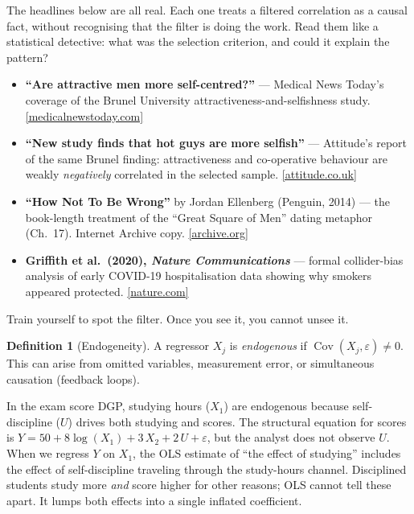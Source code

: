 \documentclass[11pt,a4paper]{article}
\theoremstyle{definition}
\newtheorem{definition}{Definition}[section]
\theoremstyle{plain}
\theoremstyle{remark}
\newcommand{\Cov}{\operatorname{Cov}}
\begin{document}
\begin{keyinsight}[title={Real Articles Committing Collider Bias}]
The headlines below are all real. Each one treats a filtered correlation as a causal fact, without recognising that the filter is doing the work. Read them like a statistical detective: what was the selection criterion, and could it explain the pattern?

\begin{itemize}[nosep]
  \item \textbf{``Are attractive men more self-centred?''} --- Medical News Today's coverage of the Brunel University attractiveness-and-selfishness study. \href{https://www.medicalnewstoday.com/articles/288998}{[medicalnewstoday.com]}
  \item \textbf{``New study finds that hot guys are more selfish''} --- Attitude's report of the same Brunel finding: attractiveness and co-operative behaviour are weakly \emph{negatively} correlated in the selected sample. \href{https://www.attitude.co.uk/news/world/new-study-finds-that-hot-guys-are-more-selfish-283534/}{[attitude.co.uk]}
  \item \textbf{``How Not To Be Wrong''} by Jordan Ellenberg (Penguin, 2014) --- the book-length treatment of the ``Great Square of Men'' dating metaphor (Ch.\ 17). Internet Archive copy. \href{https://archive.org/details/hownottobewrongp0000elle_e9m3}{[archive.org]}
  \item \textbf{Griffith et al.\ (2020), \emph{Nature Communications}} --- formal collider-bias analysis of early COVID-19 hospitalisation data showing why smokers appeared protected. \href{https://www.nature.com/articles/s41467-020-19478-2}{[nature.com]}
\end{itemize}

Train yourself to spot the filter. Once you see it, you cannot unsee it.
\end{keyinsight}

\begin{definition}[Endogeneity]
A regressor $X_j$ is \emph{endogenous} if $\Cov(X_j, \varepsilon) \neq 0$.
This can arise from omitted variables, measurement error, or simultaneous causation (feedback loops).
\end{definition}

In the exam score DGP, studying hours ($X_1$) are endogenous because self-discipline ($U$) drives both studying and scores. The structural equation for scores is $Y = 50 + 8\log(X_1) + 3\,X_2 + 2\,U + \varepsilon$, but the analyst does not observe $U$. When we regress $Y$ on $X_1$, the OLS estimate of ``the effect of studying'' includes the effect of self-discipline traveling through the study-hours channel. Disciplined students study more \emph{and} score higher for other reasons; OLS cannot tell these apart. It lumps both effects into a single inflated coefficient.
\end{document}
